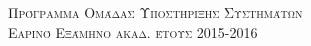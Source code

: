 \documentclass[landscape,letterpaper]{article}
\begin{document}
\pagestyle{empty} %

\noindent



\begin{center}
\textsc{\Huge Πρόγραμμα Ομάδας Υποστήριξης Συστημάτων}\\ %
\textsc{\LARGE Εαρινό Εξάμηνο ακαδ. έτους 2015-2016}\\ %
\end{center}

\end{document}
